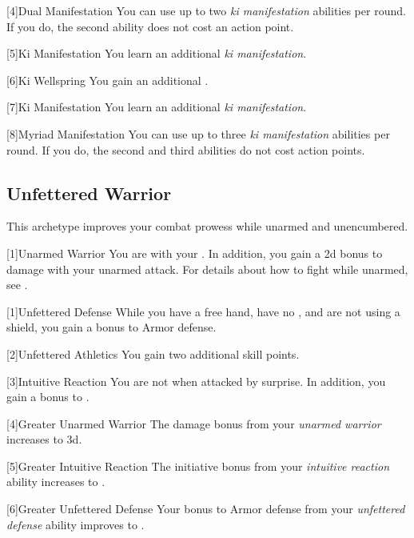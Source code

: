         [4]{Dual Manifestation} You can use up to two \textit{ki manifestation} abilities per round.
        If you do, the second ability does not cost an action point.

        [5]{Ki Manifestation}
        You learn an additional \textit{ki manifestation}.

        [6]{Ki Wellspring} You gain an additional .

        [7]{Ki Manifestation}
        You learn an additional \textit{ki manifestation}.

        [8]{Myriad Manifestation} You can use up to three \textit{ki manifestation} abilities per round.
        If you do, the second and third abilities do not cost action points.

    \subsection{Unfettered Warrior}\label{Unfettered Warrior}
        This archetype improves your combat prowess while unarmed and unencumbered.

        [1]{Unarmed Warrior}
        You are  with your .
        In addition, you gain a \plus2d bonus to damage with your unarmed attack.
        For details about how to fight while unarmed, see .

        [1]{Unfettered Defense}
        While you have a free hand, have no , and are not using a shield, you gain a  bonus to Armor defense.

        [2]{Unfettered Athletics} You gain two additional skill points.

        [3]{Intuitive Reaction}
        You are not \unaware when attacked by surprise.
        In addition, you gain a  bonus to .

        [4]{Greater Unarmed Warrior} The damage bonus from your \textit{unarmed warrior} increases to \plus3d.

        [5]{Greater Intuitive Reaction}
        The initiative bonus from your \textit{intuitive reaction} ability increases to .

        [6]{Greater Unfettered Defense}
        Your bonus to Armor defense from your \textit{unfettered defense} ability improves to .

